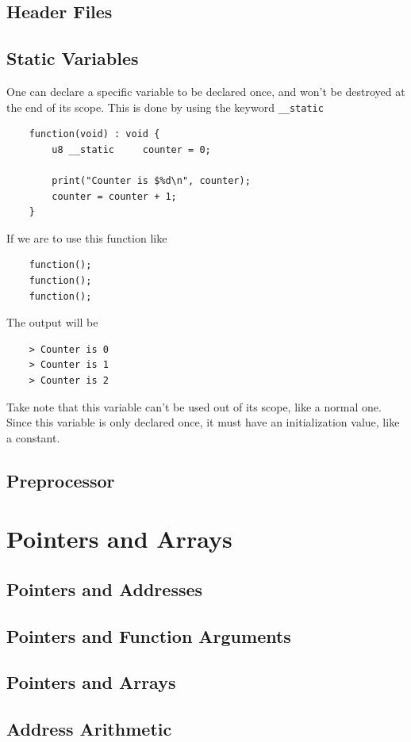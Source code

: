 \documentclass{scrartcl}
\begin{document}
        \subsection{Header Files}
        \subsection{Static Variables}
            One can declare a specific variable to be declared once, and won't
            be destroyed at the end of its scope. This is done by using the
            keyword \texttt{\_\_static}
            \begin{lstlisting}
    function(void) : void {
        u8 __static     counter = 0;

        print("Counter is $%d\n", counter);
        counter = counter + 1;
    }
            \end{lstlisting}
            If we are to use this function like
            \begin{lstlisting}
    function();
    function();
    function();
            \end{lstlisting}
            The output will be
            \begin{lstlisting}
    > Counter is 0
    > Counter is 1
    > Counter is 2
            \end{lstlisting}
            Take note that this variable can't be used out of its scope, like
            a normal one. Since this variable is only declared once, it must have
            an initialization value, like a constant.
        \subsection{Preprocessor}
    \section{Pointers and Arrays}
        \subsection{Pointers and Addresses}
        \subsection{Pointers and Function Arguments}
        \subsection{Pointers and Arrays}
        \subsection{Address Arithmetic}
\end{document}
